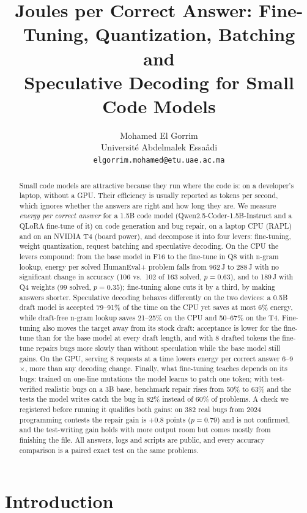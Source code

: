 \documentclass[11pt]{article}
\title{Joules per Correct Answer: Fine-Tuning, Quantization, Batching and\\
Speculative Decoding for Small Code Models}
\author{Mohamed El Gorrim\\
Universit\'e Abdelmalek Essa\^adi\\
\texttt{elgorrim.mohamed@etu.uae.ac.ma}}
\date{}
\begin{document}
\maketitle

\begin{abstract}
Small code models are attractive because they run where the code is: on a developer's laptop,
without a GPU. Their efficiency is usually reported as tokens per second, which ignores whether
the answers are right and how long they are. We measure \emph{energy per correct answer} for a
1.5B code model (Qwen2.5-Coder-1.5B-Instruct and a QLoRA fine-tune of it) on code generation and
bug repair, on a laptop CPU (RAPL) and on an NVIDIA T4 (board power), and decompose it into four
levers: fine-tuning, weight quantization, request batching and speculative decoding. On the CPU
the levers compound: from the base model in F16 to the fine-tune in Q8 with n-gram lookup, energy
per solved HumanEval+ problem falls from 962\,J to 288\,J with no significant change in accuracy
(106 vs.\ 102 of 163 solved, $p=0.63$), and to 189\,J with Q4 weights (99 solved, $p=0.35$);
fine-tuning alone cuts it by a third, by making answers shorter. Speculative decoding behaves differently on
the two devices: a 0.5B draft model is accepted 79--91\% of the time on the CPU yet saves at most
6\% energy, while draft-free n-gram lookup saves 21--25\% on the CPU and 50--67\% on the T4.
Fine-tuning also moves the target away from its stock draft: acceptance is lower for the
fine-tune than for the base model at every draft length, and with 8 drafted tokens the fine-tune
repairs bugs more slowly than without speculation while the base model still gains. On the GPU,
serving 8 requests at a time lowers energy per correct answer 6--9$\times$, more than any
decoding change. Finally, what fine-tuning teaches depends on its bugs: trained on one-line
mutations the model learns to patch one token; with test-verified realistic bugs on a 3B base,
benchmark repair rises from 50\% to 63\% and the tests the model writes catch the bug in 82\%
instead of 60\% of problems. A check we registered before running it qualifies both gains: on 382
real bugs from 2024 programming contests the repair gain is $+0.8$ points ($p=0.79$) and is not
confirmed, and the test-writing gain holds with more output room but comes mostly from finishing
the file. All answers, logs and scripts are public, and every accuracy comparison is a paired exact
test on the same problems.
\end{abstract}

\section{Introduction}
\end{document}

